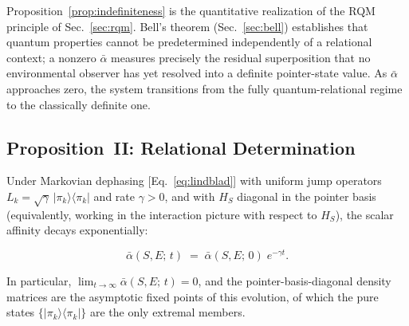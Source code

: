 \begin{remark}
Proposition~\ref{prop:indefiniteness} is the quantitative realization
of the RQM principle of Sec.~\ref{sec:rqm}.
Bell's theorem (Sec.~\ref{sec:bell}) establishes that quantum
properties cannot be predetermined independently of a relational
context; a nonzero $\bar{\alpha}$ measures precisely the residual
superposition that no environmental observer has yet resolved into
a definite pointer-state value.
As $\bar{\alpha}$ approaches zero, the system transitions from the
fully quantum-relational regime to the classically definite one.
\end{remark}


\subsection{\label{sec:prop2}Proposition~II: Relational Determination}

\begin{proposition}
\label{prop:determination}
Under Markovian dephasing [Eq.~\eqref{eq:lindblad}] with uniform
jump operators $L_k = \sqrt{\gamma}\,\vert\pi_k\rangle\langle\pi_k\vert$
and rate $\gamma > 0$, and with $H_S$ diagonal in the pointer basis
(equivalently, working in the interaction picture with respect to $H_S$),
the scalar affinity decays exponentially:

\begin{equation}
\label{eq:alpha-decay}
\bar{\alpha}(S,E;\,t)
  \;=\;
  \bar{\alpha}(S,E;\,0)\;e^{-\gamma t}.
\end{equation}

\noindent
In particular, $\lim_{t\to\infty}\bar{\alpha}(S,E;\,t) = 0$, and the
pointer-basis-diagonal density matrices are the asymptotic fixed points
of this evolution, of which the pure states
$\{\vert\pi_k\rangle\langle\pi_k\vert\}$ are the only extremal members.
\end{proposition}

